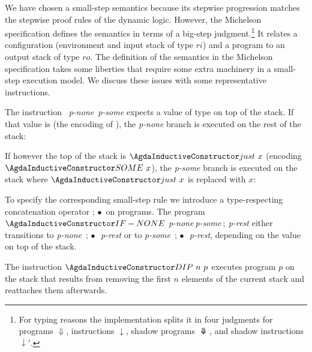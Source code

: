 We have chosen a small-step semantics because its stepwise progression
matches the stepwise proof rules of the dynamic logic. However, 
the Michelson specification defines the semantics in terms of a big-step
judgment.\footnote{For typing reasons the implementation splits it in four judgments for
  programs $\Downarrow$, instructions $\downarrow$, shadow programs $\Ddownarrow$,
  and shadow instructions $\downarrow'$.}
\BigstepConfiguration
\BigstepJudgment
It relates a configuration (environment and input stack of type $ri$) and a
program to an output stack of type $ro$.
The definition of the semantics in the Michelson specification takes
some liberties that require some extra machinery in a small-step execution
model. We discuss these issues with some representative instructions.

The instruction ~\textit{p-none}~\textit{p-some} expects
a value of  type  on top of the stack.
If that value is  (the encoding of ), the
\textit{p-none} branch is executed on the rest of the stack:
\BigstepIfNone


If however the top of the stack is $\ACon{just}~x$ (encoding $\ACon{SOME}~x$),
the \textit{p-some} branch is executed on the stack where  $\ACon{just}~x$
is replaced with $x$:
\BigstepIfSome

To specify the corresponding small-step rule we introduce a type-respecting concatenation
operator $;\!\bullet$ on programs. 
The program $\ACon{IF-NONE}~$\textit{p-none}$~$\textit{p-some}$~;~$\textit{p-rest} either transitions to
\textit{p-none}~$;\!\bullet$~\textit{p-rest} or to \textit{p-some}~$;\!\bullet$~\textit{p-rest},
depending on the value on top of the stack.

The instruction $\ACon{DIP}~n~p$ executes program $p$ on the stack that results from removing the first $n$ elements
of the current stack and reattaches them afterwards.
\BigstepDIP


